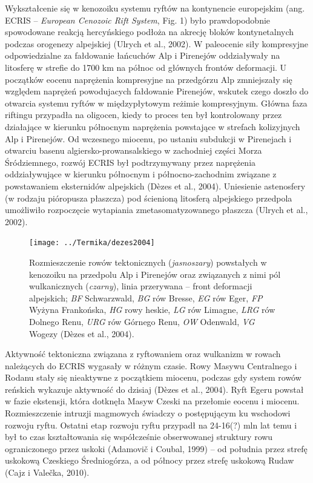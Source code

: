 \documentclass[11.5pt,twoside]{report}
\begin{document}
Wykształcenie się w kenozoiku systemu ryftów na kontynencie europejskim (ang. ECRIS -- \textit{European Cenozoic Rift System}, Fig. 1) było prawdopodobnie spowodowane reakcją hercyńskiego podłoża na akrecję bloków kontynetalnych podczas orogenezy alpejskiej (Ulrych et al., 2002). W paleocenie siły kompresyjne odpowiedzialne za fałdowanie łańcuchów Alp i Pirenejów oddziaływały na litosferę w strefie do 1700 km na północ od głównych frontów deformacji. U początków eocenu naprężenia kompresyjne na przedgórzu Alp zmniejszały się względem naprężeń powodujacych fałdowanie Pirenejów, wskutek czego doszło do otwarcia systemu ryftów w międzypłytowym reżimie kompresyjnym. Główna faza riftingu przypadła na oligocen, kiedy to proces ten był kontrolowany przez działające w kierunku północnym naprężenia powstające w strefach kolizyjnych Alp i Pirenejów. Od wczesnego miocenu, po ustaniu subdukcji w Pirenejach i otwarciu basenu algiersko-prowansalskiego w zachodniej części Morza Śródziemnego, rozwój ECRIS był podtrzymywany przez naprężenia oddziaływujące w kierunku północnym i północno-zachodnim związane z powstawaniem eksternidów alpejskich (D\`{e}zes et al., 2004). Uniesienie astenosfery (w rodzaju pióropusza płaszcza) pod ścienioną litosferą alpejskiego przedpola umożliwiło rozpoczęcie wytapiania zmetasomatyzowanego płaszcza (Ulrych et al., 2002).

\begin{figure}[h]
	\centering
	\texttt{[image: ../Termika/dezes2004]}
	\caption{Rozmieszczenie rowów tektonicznych (\textit{jasnoszary}) powstałych w kenozoiku na przedpolu Alp i Pirenejów oraz związanych z nimi pól wulkanicznych (\textit{czarny}), linia przerywana -- front deformacji alpejskich; \textit{BF} Schwarzwald, \textit{BG} rów Bresse, \textit{EG} rów Eger, \textit{FP} Wyżyna Frankońska, \textit{HG} rowy heskie, \textit{LG} rów Limagne, \textit{LRG} rów Dolnego Renu, \textit{URG} rów Górnego Renu, \textit{OW} Odenwald, \textit{VG} Wogezy (D\`{e}zes et al., 2004).}
\label{Fig.}
\end{figure}

Aktywność tektoniczna związana z ryftowaniem oraz wulkanizm w rowach należących do ECRIS wygasały w różnym czasie. Rowy Masywu Centralnego i Rodanu stały się nieaktywne z początkiem miocenu, podczas gdy system rowów reńskich wykazuje aktywność do dzisiaj (D\`{e}zes et al., 2004). Ryft Egeru powstał w fazie ekstensji, która dotknęła Masyw Czeski na przełomie eocenu i miocenu. Rozmieszczenie intruzji magmowych świadczy o postępującym ku wschodowi rozwoju ryftu. Ostatni etap rozwoju ryftu przypadł na 24-16(?) mln lat temu i był to czas kształtowania się współcześnie obserwowanej struktury rowu ograniczonego przez uskoki (Adamovič i Coubal, 1999) -- od południa przez strefę uskokową Czeskiego Średniogórza, a od północy przez strefę uskokową Rudaw (Cajz i Valečka, 2010).
\end{document}
